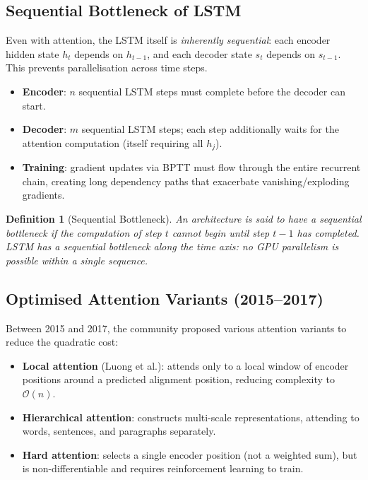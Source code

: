 \documentclass[12pt,a4paper]{article}
\newtheorem{definition}{Definition}[section]
\begin{document}
\subsection{Sequential Bottleneck of LSTM}

Even with attention, the LSTM itself is \emph{inherently sequential}:
each encoder hidden state $h_t$ depends on $h_{t-1}$, and each
decoder state $s_t$ depends on $s_{t-1}$.  This prevents
parallelisation across time steps.

\begin{itemize}
  \item \textbf{Encoder}: $n$ sequential LSTM steps must complete
        before the decoder can start.
  \item \textbf{Decoder}: $m$ sequential LSTM steps; each step
        additionally waits for the attention computation (itself
        requiring all $h_j$).
  \item \textbf{Training}: gradient updates via BPTT must flow
        through the entire recurrent chain, creating long dependency
        paths that exacerbate vanishing/exploding gradients.
\end{itemize}

\begin{definition}[Sequential Bottleneck]
\label{def:seq-bottleneck}
An architecture is said to have a \emph{sequential bottleneck} if the
computation of step $t$ cannot begin until step $t-1$ has completed.
LSTM has a sequential bottleneck along the time axis: no GPU
parallelism is possible within a single sequence.
\end{definition}

\subsection{Optimised Attention Variants (2015--2017)}

Between 2015 and 2017, the community proposed various attention
variants to reduce the quadratic cost:

\begin{itemize}
  \item \textbf{Local attention} (Luong et al.): attends only to a
        local window of encoder positions around a predicted
        alignment position, reducing complexity to $\mathcal{O}(n)$.
  \item \textbf{Hierarchical attention}: constructs multi-scale
        representations, attending to words, sentences, and
        paragraphs separately.
  \item \textbf{Hard attention}: selects a single encoder position
        (not a weighted sum), but is non-differentiable and requires
        reinforcement learning to train.
\end{itemize}
\end{document}
